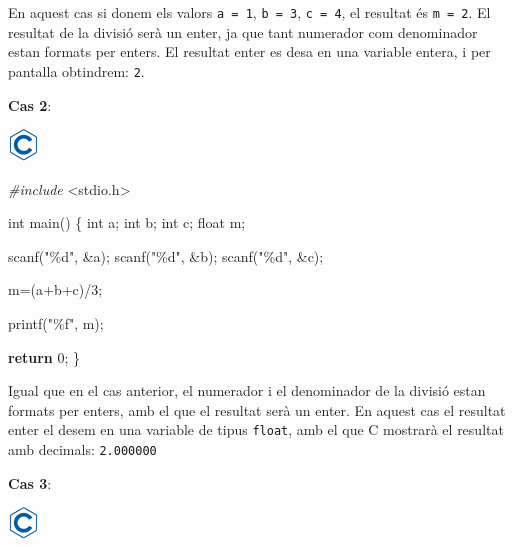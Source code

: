 \documentclass[]{book}
\newenvironment{Shaded}{\begin{snugshade}}{\end{snugshade}}
\newcommand{\ControlFlowTok}[1]{\textcolor[rgb]{0.13,0.29,0.53}{\textbf{#1}}}
\newcommand{\DataTypeTok}[1]{\textcolor[rgb]{0.13,0.29,0.53}{#1}}
\newcommand{\DecValTok}[1]{\textcolor[rgb]{0.00,0.00,0.81}{#1}}
\newcommand{\ImportTok}[1]{#1}
\newcommand{\NormalTok}[1]{#1}
\newcommand{\PreprocessorTok}[1]{\textcolor[rgb]{0.56,0.35,0.01}{\textit{#1}}}
\newcommand{\StringTok}[1]{\textcolor[rgb]{0.31,0.60,0.02}{#1}}
\begin{document}
En aquest cas si donem els valors \texttt{a\ =\ 1}, \texttt{b\ =\ 3}, \texttt{c\ =\ 4}, el resultat és \texttt{m\ =\ 2}. El resultat de la divisió serà un enter, ja que tant numerador com denominador estan formats per enters. El resultat enter es desa en una variable entera, i per pantalla obtindrem: \texttt{2}.

\textbf{Cas 2}:

\includegraphics{./img/c.png}

\begin{Shaded}
\begin{Highlighting}[]
\PreprocessorTok{\#include }\ImportTok{\textless{}stdio.h\textgreater{}}

\DataTypeTok{int}\NormalTok{ main() \{}
   \DataTypeTok{int}\NormalTok{ a;}
   \DataTypeTok{int}\NormalTok{ b;}
   \DataTypeTok{int}\NormalTok{ c;}
   \DataTypeTok{float}\NormalTok{ m;}

\NormalTok{   scanf(}\StringTok{"\%d"}\NormalTok{, \&a);}
\NormalTok{   scanf(}\StringTok{"\%d"}\NormalTok{, \&b);}
\NormalTok{   scanf(}\StringTok{"\%d"}\NormalTok{, \&c);}

\NormalTok{   m=(a+b+c)/}\DecValTok{3}\NormalTok{;}

\NormalTok{   printf(}\StringTok{"\%f"}\NormalTok{, m);}

   \ControlFlowTok{return} \DecValTok{0}\NormalTok{;}
\NormalTok{\}}
\end{Highlighting}
\end{Shaded}

Igual que en el cas anterior, el numerador i el denominador de la divisió estan formats per enters, amb el que el resultat serà un enter. En aquest cas el resultat enter el desem en una variable de tipus \texttt{float}, amb el que C mostrarà el resultat amb decimals: \texttt{2.000000}

\textbf{Cas 3}:

\includegraphics{./img/c.png}
\end{document}

